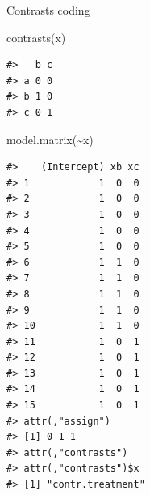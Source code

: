 \documentclass[
  ignorenonframetext,
]{beamer}
\newenvironment{Shaded}{\begin{snugshade}}{\end{snugshade}}
\newcommand{\FunctionTok}[1]{\textcolor[rgb]{0.28,0.35,0.67}{#1}}
\newcommand{\NormalTok}[1]{\textcolor[rgb]{0.00,0.23,0.31}{#1}}
\newcommand{\SpecialCharTok}[1]{\textcolor[rgb]{0.37,0.37,0.37}{#1}}
\begin{document}
\begin{frame}[fragile]{Contrasts coding}
\label{contrasts-coding-1}
\begin{Shaded}
\begin{Highlighting}[]
\FunctionTok{contrasts}\NormalTok{(x)}
\end{Highlighting}
\end{Shaded}

\begin{verbatim}
#>   b c
#> a 0 0
#> b 1 0
#> c 0 1
\end{verbatim}

\begin{Shaded}
\begin{Highlighting}[]
\FunctionTok{model.matrix}\NormalTok{(}\SpecialCharTok{\textasciitilde{}}\NormalTok{x)}
\end{Highlighting}
\end{Shaded}

\begin{verbatim}
#>    (Intercept) xb xc
#> 1            1  0  0
#> 2            1  0  0
#> 3            1  0  0
#> 4            1  0  0
#> 5            1  0  0
#> 6            1  1  0
#> 7            1  1  0
#> 8            1  1  0
#> 9            1  1  0
#> 10           1  1  0
#> 11           1  0  1
#> 12           1  0  1
#> 13           1  0  1
#> 14           1  0  1
#> 15           1  0  1
#> attr(,"assign")
#> [1] 0 1 1
#> attr(,"contrasts")
#> attr(,"contrasts")$x
#> [1] "contr.treatment"
\end{verbatim}
\end{frame}
\end{document}
